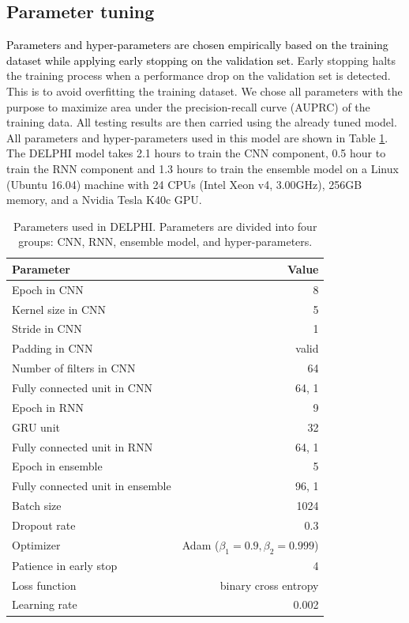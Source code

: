 \documentclass{bioinfo}
\newcommand{\myColor}{black}
\begin{document}
\begin{methods}
\subsection{Parameter tuning}
\textcolor{\myColor}{Parameters and hyper-parameters are chosen empirically based on the training dataset while applying early stopping \citep{prechelt1998early} on the validation set.} Early stopping halts the training process when a performance drop on the validation set is detected. This is to avoid overfitting the training dataset. We chose all parameters with the purpose to maximize area under the precision-recall curve (AUPRC) of the training data. All testing results are then carried using the already tuned model. All parameters and hyper-parameters used in this model are shown in Table \ref{tab_parameter}. 
The DELPHI model takes 2.1 hours to train the CNN component, 0.5 hour to train the RNN component and 1.3 hours to train the ensemble model on a Linux (Ubuntu 16.04) machine with 24 CPUs (Intel Xeon v4, 3.00GHz), 256GB memory, and a Nvidia Tesla K40c GPU.

\begin{table}[H]
  \centering
  \caption{Parameters used in DELPHI. Parameters are divided into four groups: CNN, RNN, ensemble model, and hyper-parameters.}
    \begin{tabular}{@{}p{4.4cm}r@{}}
    \toprule
    Parameter & Value \\
    \midrule
    Epoch in CNN & 8 \\
    Kernel size in CNN & 5 \\
    Stride in CNN & 1 \\
    Padding in CNN & valid \\
    Number of filters in CNN & 64 \\
    Fully connected unit in CNN & 64, 1 \\
    \hline
    Epoch in RNN & 9 \\
    GRU unit & 32 \\
    Fully connected unit in RNN & 64, 1 \\
    \hline
    Epoch in ensemble & 5 \\
    Fully connected unit in ensemble & 96, 1 \\
    \hline
    Batch size & 1024 \\
    Dropout rate & 0.3 \\
    Optimizer & Adam ($\beta_1=0.9, \beta_2=0.999$) \\
    Patience in early stop & 4 \\
    Loss function & binary cross entropy \\
    Learning rate & 0.002 \\
    \bottomrule
    \end{tabular}%
  \label{tab_parameter}%
\end{table}%

\end{methods}
\end{document}
